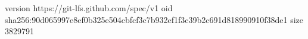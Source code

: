 version https://git-lfs.github.com/spec/v1
oid sha256:90d065997e8ef0b325e504cbfcf3c7b932ef1f3c39b2c691d818990910f38de1
size 3829791
